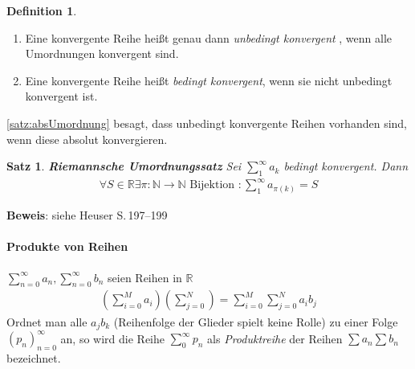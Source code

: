 \documentclass[ngerman,titlepage,twoside, parskip=half*]{scrreprt}
\newcommand*{\N}{\mathbb{N}}
\newcommand*{\R}{\mathbb{R}}
\theoremstyle{plain}
\newtheorem{theorem}{Satz}[section]
\theoremstyle{definition}
\newtheorem{definition}{Definition}
\theoremstyle{remark}
\begin{document}
\begin{definition}
\begin{enumerate}[(1)]
  \item Eine konvergente Reihe heißt genau dann \emph{unbedingt kon\-ver\-gent
    }, wenn alle Umordnungen konvergent sind.
  \item Eine konvergente Reihe heißt \emph{bedingt konvergent}, wenn
    sie nicht unbedingt kon\-ver\-gent ist.
\end{enumerate}
\end{definition}

\autoref{satz:absUmordnung} besagt, dass unbedingt konvergente Reihen vorhanden sind, wenn diese absolut konvergieren.

\begin{theorem}
\textbf{Riemannsche Umordnungssatz} Sei $\sum_1^\infty
a_k$ bedingt konvergent. Dann 
\begin{gather*}\forall S \in \R \exists \pi \colon\N\rightarrow\N \text{ Bijektion }\colon\sum_1^\infty a_{\pi(k)}=S\end{gather*}
\end{theorem}
\textbf{Beweis}: siehe Heuser S.\,197--199

\paragraph{Produkte von Reihen}

$\sum_{n=0}^\infty a_n, \sum_{n=0}^\infty b_n$ seien Reihen in $\R$
\begin{gather*}\left(\sum_{i=0}^M a_i\right)\left( \sum_{j=0}^N\right) =\sum_{i=0}^M \sum_{j=0}^N a_ib_j\end{gather*}
Ordnet man alle $a_jb_k$ (Reihenfolge der Glieder spielt keine Rolle) zu einer Folge $(p_n)_{n=0}^\infty$ an, so wird
die Reihe $\sum_0^\infty p_n$ als \emph{Produktreihe} der Reihen $\sum a_n \sum b_n$ bezeichnet.
\end{document}

